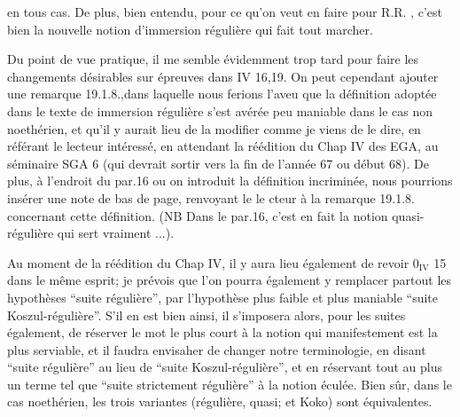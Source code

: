 
en tous cas. De plus, bien entendu, pour ce qu'on veut en faire pour
R.R. , c'est bien la nouvelle notion d'immersion régulière qui fait
tout marcher.

Du point de vue pratique, il me semble évidemment trop tard pour
faire les changements désirables sur épreuves dans IV 16,19. On peut
cependant ajouter une remarque 19.1.8.,dans laquelle nous ferions l'aveu
\margin{\handwritten{\rule{0.25pt}{4.8cm}\hspace{2pt}\rule{0.25pt}{4.8cm}}}que  la définition adoptée dans le texte de immersion régulière s'est
 avérée peu maniable dans le cas non noethérien, et qu'il y aurait
lieu de la modifier comme je viens de le dire, en référant le lecteur
intéressé,  en attendant la réédition du Chap IV des EGA, au séminaire
SGA 6 (qui devrait sortir vers la fin de l'année 67 ou début 68). De
plus, à l'endroit du par.16 ou on introduit la définition incriminée,
nous pourrions insérer une note de bas de page, renvoyant le le cteur
à la remarque 19.1.8. concernant cette définition. (NB Dans le par.16,
c'est en fait la notion quasi-régulière qui sert vraiment ...).

Au moment de la réédition du Chap IV, il y aura lieu également de
revoir $0_{\mathrm{IV}}$ 15 dans le même esprit; je prévois que l'on pourra également
y remplacer partout les hypothèses ``suite régulière'', par l'hypothèse
plus faible et plus maniable ``suite Koszul-régulière''. S'il en est
bien ainsi, il s'imposera alors, pour les suites également, de réserver
le mot le plus court à la notion qui manifestement est la plus serviable,
et il faudra envisaher de changer  notre terminologie, en disant
``suite régulière'' au lieu de ``suite Koszul-régulière'', et en réservant
tout au plus un terme tel que ``suite strictement régulière'' à la notion
éculée. Bien sûr, dans le cas noethérien, les trois variantes (régulière,
quasi; et Koko) sont équivalentes.

